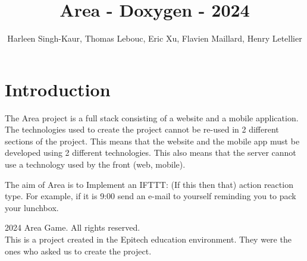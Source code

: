 \documentclass{article}
\begin{document}
\title{Area - Doxygen - 2024}
\author{Harleen Singh-Kaur, Thomas Lebouc, Eric Xu, Flavien Maillard, Henry Letellier}
\date{}
\maketitle

\section{Introduction}
The Area project is a full stack consisting of a website and a mobile application.
The technologies used to create the project cannot be re-used in 2 different sections of the project.
This means that the website and the mobile app must be developed using 2 different technologies.
This also means that the server cannot use a technology used by the front (web, mobile).

The aim of Area is to Implement an IFTTT: (If this then that) action reaction type.
For example, if it is 9:00 send an e-mail to yourself reminding you to pack your lunchbox.

\lipsum[1-10]

\clearpage
\thispagestyle{empty} %
\begin{center}
    \small \textcopyright{} 2024 Area Game. All rights reserved. \\
    \small This is a project created in the Epitech education environment.
    \small They were the ones who asked us to create the project.
\end{center}
\end{document}
